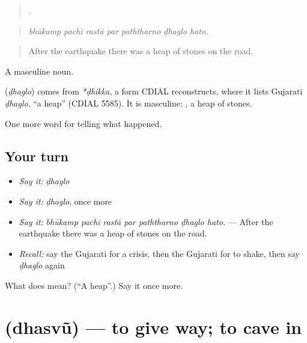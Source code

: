 \begin{quote}
      .
\end{quote}

\begin{quote}
\emph{bhūkamp pachī rastā par paththarno ḍhaglo hato.}
\end{quote}

\begin{quote}
After the earthquake there was a heap of stones on the road.
\end{quote}

A masculine noun.

\begin{cousinweb}
\textbf{} (\emph{ḍhaglo}) comes from \emph{*ḍhikka}, a form CDIAL reconstructs, where it lists Gujarati \emph{ḍhaglo}, \textquotedblleft{}a heap\textquotedblright{} (CDIAL 5585). It is masculine: \textbf{ }, a heap of stones.
\end{cousinweb}

\begin{grammarlens}[title={What you've built}]
One more word for telling what happened.
\end{grammarlens}

\subsection*{Your turn}
\begin{itemize}
\raggedright
  \item \emph{Say it:} \emph{ḍhaglo}
  \item \emph{Say it:} \emph{ḍhaglo}, once more
  \item \emph{Say it:} \emph{bhūkamp pachī rastā par paththarno ḍhaglo hato.} — After the earthquake there was a heap of stones on the road.
  \item \emph{Recall:} say the Gujarati for a crisis, then the Gujarati for to shake, then say \emph{ḍhaglo} again
\end{itemize}

\begin{tcolorbox}[breakable,colback=teal!4,colframe=teal!35!black,title={Before you move on}]
What does  mean? (\textquotedblleft{}A heap\textquotedblright{}.) Say it once more.
\end{tcolorbox}
\section[\texorpdfstring{\gu{ધસવું} (dhasvũ)}{ધસવું (dhasvũ)}]{ (dhasvũ) — to give way; to cave in}

